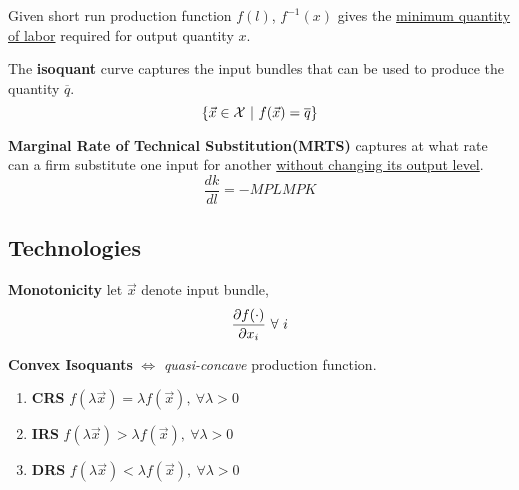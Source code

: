 \documentclass[]{article}
\begin{document}
            \begin{remark}
                Given short run production function $f(l)$, $f^{-1}(x)$ gives the \ul{minimum quantity of labor} required for output quantity $x$.
            \end{remark}
            
            \begin{definition}
                The \textbf{isoquant} curve captures the input bundles that can be used to produce the quantity $\overline{q}$.
                \[
                    \{ \vec{x} \in \mathcal{{X}}\ | \ f(\vec{x}) = \overline{q} \}
                \]
            \end{definition}
            
            \begin{definition}
                \textbf{Marginal Rate of Technical Substitution(MRTS)} captures at what rate can a firm substitute one input for another \ul{without changing its output level}.
                \[
                    \frac{dk}{dl} = -{MPL}{MPK}
                \]
            \end{definition}
            
        \subsection{Technologies}
            \begin{definition}
                \textbf{Monotonicity} let $\vec{x}$ denote input bundle,
                \[
                    \pd{f(\cdot)}{x_i}\ \forall \ i
                \]
            \end{definition}
            
            \begin{definition}
                \textbf{Convex Isoquants} $\iff$ \emph{quasi-concave} production function.
            \end{definition}
            
            \begin{definition}
                \begin{enumerate}
                    \item \textbf{CRS} $f(\lambda \vec{x}) = \lambda f(\vec{x}),\ \forall \lambda > 0$
                    \item \textbf{IRS} $f(\lambda \vec{x}) > \lambda f(\vec{x}),\ \forall \lambda > 0$
                    \item \textbf{DRS} $f(\lambda \vec{x}) < \lambda f(\vec{x}),\ \forall \lambda > 0$
                \end{enumerate}
            \end{definition}
            
\end{document}
